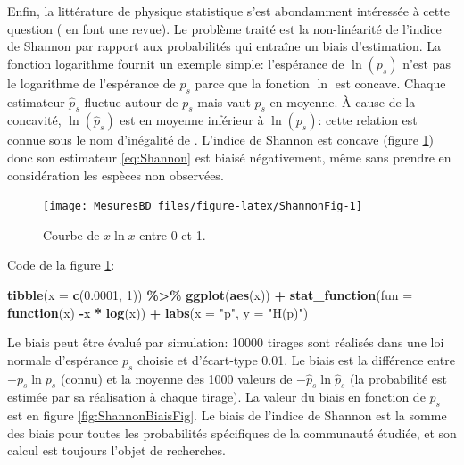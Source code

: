 \documentclass[
  11pt,
  american,
  a4paper,
  extrafontsizes,onecolumn,openright
  ]{memoir}
\newenvironment{Shaded}{\begin{snugshade}}{\end{snugshade}}
\newcommand{\AttributeTok}[1]{\textcolor[rgb]{0.13,0.29,0.53}{#1}}
\newcommand{\ControlFlowTok}[1]{\textcolor[rgb]{0.13,0.29,0.53}{\textbf{#1}}}
\newcommand{\DecValTok}[1]{\textcolor[rgb]{0.00,0.00,0.81}{#1}}
\newcommand{\FloatTok}[1]{\textcolor[rgb]{0.00,0.00,0.81}{#1}}
\newcommand{\FunctionTok}[1]{\textcolor[rgb]{0.13,0.29,0.53}{\textbf{#1}}}
\newcommand{\NormalTok}[1]{#1}
\newcommand{\SpecialCharTok}[1]{\textcolor[rgb]{0.81,0.36,0.00}{\textbf{#1}}}
\newcommand{\StringTok}[1]{\textcolor[rgb]{0.31,0.60,0.02}{#1}}
\begin{document}
Enfin, la littérature de physique statistique s'est abondamment intéressée à cette question (\textcite{Bonachela2008} en font une revue).
Le problème traité est la non-linéarité de l'indice de Shannon par rapport aux probabilités qui entraîne un biais d'estimation.
La fonction logarithme fournit un exemple simple: l'espérance de \(\ln(p_s)\) n'est pas le logarithme de l'espérance de \(p_s\) parce que la fonction \(\ln\) est concave.
Chaque estimateur \({\hat{p}}_s\) fluctue autour de \(p_s\) mais vaut \(p_s\) en moyenne.
À cause de la concavité, \(\ln(\hat{p}_s)\) est en moyenne inférieur à \(\ln(p_s)\): cette relation est connue sous le nom d'inégalité de \textcite{Jensen1906}.
L'indice de Shannon est concave (figure \ref{fig:ShannonFig}) donc son estimateur \eqref{eq:Shannon} est biaisé négativement, même sans prendre en considération les espèces non observées.



\scriptsize

\begin{figure}

{\centering \texttt{[image: MesuresBD\_files/figure-latex/ShannonFig-1]} 

}

\caption{Courbe de \(x\ln x\) entre 0 et 1.}\label{fig:ShannonFig}
\end{figure}

\normalsize

Code de la figure \ref{fig:ShannonFig}:

\scriptsize

\begin{Shaded}
\begin{Highlighting}[]
\FunctionTok{tibble}\NormalTok{(}\AttributeTok{x =} \FunctionTok{c}\NormalTok{(}\FloatTok{0.0001}\NormalTok{, }\DecValTok{1}\NormalTok{)) }\SpecialCharTok{\%\textgreater{}\%} 
  \FunctionTok{ggplot}\NormalTok{(}\FunctionTok{aes}\NormalTok{(x)) }\SpecialCharTok{+} 
    \FunctionTok{stat\_function}\NormalTok{(}\AttributeTok{fun =} \ControlFlowTok{function}\NormalTok{(x) }\SpecialCharTok{{-}}\NormalTok{x }\SpecialCharTok{*} \FunctionTok{log}\NormalTok{(x)) }\SpecialCharTok{+}
    \FunctionTok{labs}\NormalTok{(}\AttributeTok{x =} \StringTok{"p"}\NormalTok{, }\AttributeTok{y =} \StringTok{"H(p)"}\NormalTok{)}
\end{Highlighting}
\end{Shaded}

\normalsize

Le biais peut être évalué par simulation: 10000 tirages sont réalisés dans une loi normale d'espérance \(p_s\) choisie et d'écart-type 0.01.
Le biais est la différence entre \(-p_s \ln{p_s}\) (connu) et la moyenne des 1000 valeurs de \(-\hat{p}_s \ln{\hat{p}}_s\) (la probabilité est estimée par sa réalisation à chaque tirage).
La valeur du biais en fonction de \(p_s\) est en figure \ref{fig:ShannonBiaisFig}.
Le biais de l'indice de Shannon est la somme des biais pour toutes les probabilités spécifiques de la communauté étudiée, et son calcul est toujours l'objet de recherches.
\end{document}
